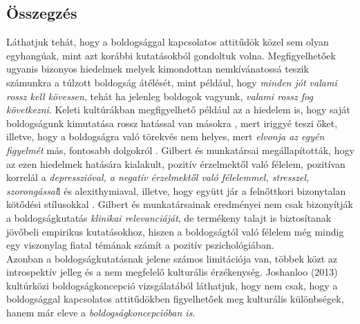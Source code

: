 \subsection*{Összegzés}
Láthatjuk tehát, hogy a boldogsággal kapcsolatos attitűdök közel sem olyan egyhangúak, mint azt korábbi kutatásokból gondoltuk volna. Megfigyelhetőek ugyanis bizonyos hiedelmek \cite{joshanloo_weijers_2013} melyek kimondottan nemkívána\-tossá teszik számunkra a túlzott boldogság átélését, mint például, hogy \textit{minden jót valami rossz kell kövessen}, tehát ha jelenleg boldogok vagyunk, \textit{valami rossz fog következni}. Keleti kultúrákban megfigyelhető például az a hiedelem is, hogy saját boldogságunk kimutatása rossz hatással van másokra \cite{joshanloo_weijers_2013}, mert iriggyé teszi őket, illetve, hogy a boldogságra való törekvés nem helyes, mert \textit{elvonja az egyén figyelmét} más, fontosabb dolgokról \cite{joshanloo_weijers_2013}. Gilbert és munkatársai megállapították, hogy az ezen hiedelmek hatására kialakult, pozitív érzelmektől való félelem, pozitívan korrelál a \textit{depresszióval, a negatív érzelmektől való félelemmel, stresszel, szorongással}l és alexithymiaval, illetve, hogy együtt jár a felnőttkori bizonytalan kötődési stílusokkal \cite{gilbert_mcewan_catarino_baiao_palmeira_2013}. Gilbert és munkatársainak eredményei nem csak bizonyítják a boldogságkutatás \textit{klinikai relevanciáját}, de termékeny talajt is biztosítanak jövőbeli empirikus kutatásokhoz, hiszen a boldogságtól való félelem még mindig egy viszonylag fiatal témának számít a pozitív pszichológiában. \\
Azonban a boldogságkutatásnak jelene számos limitációja van, többek közt az introspektív jelleg és a nem megfelelő kulturális érzékenység. Joshanloo (2013) kultúrközi boldogságkoncepció vizsgálatából láthatjuk, hogy nem csak, hogy a boldog\-sággal kapcsolatos attitűdökben figyelhetőek meg kulturális különbségek, hanem már eleve a \textit{boldogságkoncepcióban is.}













































